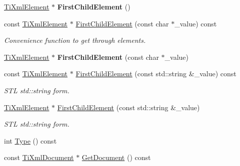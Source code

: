 \begin{DoxyCompactItemize}
\hypertarget{class_ti_xml_node_aa0fecff1f3866ab33a8a25506e95db1d}{}\label{class_ti_xml_node_aa0fecff1f3866ab33a8a25506e95db1d} 
\hyperlink{class_ti_xml_element}{Ti\+Xml\+Element} $\ast$ {\bfseries First\+Child\+Element} ()
\item 
\hypertarget{class_ti_xml_node_aab23fca4c2455c1d926c35d85a663842}{}\label{class_ti_xml_node_aab23fca4c2455c1d926c35d85a663842} 
const \hyperlink{class_ti_xml_element}{Ti\+Xml\+Element} $\ast$ \hyperlink{class_ti_xml_node_aab23fca4c2455c1d926c35d85a663842}{First\+Child\+Element} (const char $\ast$\+\_\+value) const
\begin{DoxyCompactList}\small\item\em Convenience function to get through elements. \end{DoxyCompactList}\item 
\hypertarget{class_ti_xml_node_a6936ae323675071808ac4840379e57f5}{}\label{class_ti_xml_node_a6936ae323675071808ac4840379e57f5} 
\hyperlink{class_ti_xml_element}{Ti\+Xml\+Element} $\ast$ {\bfseries First\+Child\+Element} (const char $\ast$\+\_\+value)
\item 
\hypertarget{class_ti_xml_node_abfe4a2abe61324def87fe421946f9df9}{}\label{class_ti_xml_node_abfe4a2abe61324def87fe421946f9df9} 
const \hyperlink{class_ti_xml_element}{Ti\+Xml\+Element} $\ast$ \hyperlink{class_ti_xml_node_abfe4a2abe61324def87fe421946f9df9}{First\+Child\+Element} (const std\+::string \&\+\_\+value) const
\begin{DoxyCompactList}\small\item\em S\+TL std\+::string form. \end{DoxyCompactList}\item 
\hypertarget{class_ti_xml_node_a7f1d7291880534c1e5cdeb392d8c1f45}{}\label{class_ti_xml_node_a7f1d7291880534c1e5cdeb392d8c1f45} 
\hyperlink{class_ti_xml_element}{Ti\+Xml\+Element} $\ast$ \hyperlink{class_ti_xml_node_a7f1d7291880534c1e5cdeb392d8c1f45}{First\+Child\+Element} (const std\+::string \&\+\_\+value)
\begin{DoxyCompactList}\small\item\em S\+TL std\+::string form. \end{DoxyCompactList}\item 
int \hyperlink{class_ti_xml_node_a0f4dd916b2afc2ab2f1a84f3e2b8fd5d}{Type} () const
\item 
const \hyperlink{class_ti_xml_document}{Ti\+Xml\+Document} $\ast$ \hyperlink{class_ti_xml_node_adcb070acefcbaedaa0673d82e530538b}{Get\+Document} () const
\item 

\end{DoxyCompactItemize}

